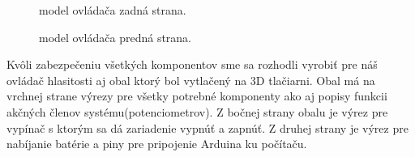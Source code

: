 \begin{figure}[!tbh]
\centering
{}
\caption{model ovládača zadná strana.}\label{OBRAZOK 1.6}
\end{figure}

\begin{figure}[!tbh]
\centering
{}
\caption{model ovládača predná strana.}\label{OBRAZOK 1.7}
\end{figure}

Kvôli zabezpečeniu všetkých komponentov sme sa rozhodli vyrobiť pre náš ovládač hlasitosti aj obal ktorý bol vytlačený na 3D tlačiarni. Obal má na vrchnej strane výrezy pre všetky potrebné komponenty ako aj popisy funkcii akčných členov systému(potenciometrov). Z bočnej strany obalu je výrez pre vypínač s ktorým sa dá zariadenie vypnúť a zapnúť. Z druhej strany je výrez pre nabíjanie batérie a piny pre pripojenie Arduina ku počítaču.



